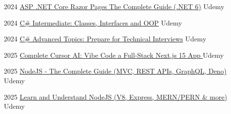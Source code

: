 \documentclass[letterpaper]{twentysecondcv} %
\begin{document}
{\begin{twenty}
        

        \twentyitem
        {2024}
        {
            \href{https://ude.my/UC-591f3b18-2bb5-405e-809f-f255c5c55927/}
            {ASP .NET Core Razor Pages The Complete Guide (.NET 6)}
        }
        {Udemy}
        {}

        \twentyitem
        {2024}
        {
            \href{https://ude.my/UC-f1dfcd3c-e4a3-4f3d-8ae6-9148a94ebebe/}
            {C\# Intermediate: Classes, Interfaces and OOP}
        }
        {Udemy}
        {}

        \twentyitem
        {2024}
        {
            \href{https://ude.my/UC-ecdfb40b-3f0d-44c4-ba49-7bfc833aa040/}
            {C\# Advanced Topics: Prepare for Technical Interviews}
        }
        {Udemy}
        {}
        
        \twentyitem
        {2025}
        {
            \href{}
            {Complete Cursor AI: Vibe Code a Full-Stack Next.js 15 App }
        }
        {Udemy}
        {}
        
        \twentyitem
        {2025}
        {
            \href{}
            {NodeJS - The Complete Guide (MVC, REST APIs, GraphQL, Deno) }
        }
        {Udemy}
        {}
        
        \twentyitem
        {2025}
        {
            \href{}
            {Learn and Understand NodeJS (V8, Express, MERN/PERN \& more)}
        }
        {Udemy}
        {}

\end{twenty}
}


 \restoregeometry
\end{document}
